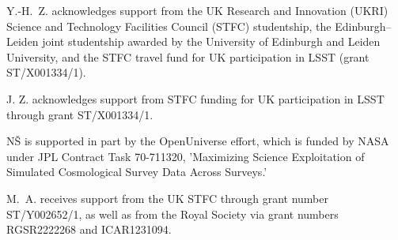 \documentclass[a4paper, 11pt]{article}
\begin{document}
Y.-H.~Z. acknowledges support from the UK Research and Innovation (UKRI) Science and Technology Facilities Council (STFC) studentship, the Edinburgh--Leiden joint studentship awarded by the University of Edinburgh and Leiden University, and the STFC travel fund for UK participation in LSST (grant ST/X001334/1).

J. Z. acknowledges support from STFC funding for UK participation in LSST through grant ST/X001334/1.

N\v{S} is supported in part by the OpenUniverse effort, which is funded by NASA under JPL Contract Task 70-711320, 'Maximizing Science Exploitation of Simulated Cosmological Survey Data Across Surveys.'

M.~A. receives support from the UK STFC through grant number ST/Y002652/1, as well as from the Royal Society via grant numbers RGSR2222268 and ICAR1231094.
\end{document}
